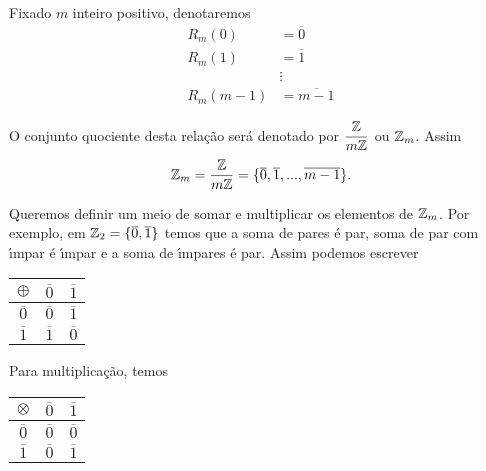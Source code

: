 \documentclass{beamer}
\begin{document}
    \begin{frame}
        \begin{observacao}
        Fixado $m$ inteiro positivo, denotaremos
        \begin{align*}
            R_{m}(0) &= \overline{0}\\
            R_{m}(1) &= \overline{1}\\
            &\vdots\\
            R_{m}(m-1) &= \overline{m-1}
        \end{align*}

        O conjunto quociente desta rela{\c c}{\~a}o ser{\'a} denotado por $\displaystyle\frac{\mathbb{Z}}{m\mathbb{Z}}$ ou $\mathbb{Z}_m$. Assim
        \[
            \mathbb{Z}_m = \displaystyle\frac{\mathbb{Z}}{m\mathbb{Z}}=\{\overline{0},\overline{1},...,\overline{m-1}\}.
        \]
        \end{observacao}
    \end{frame}

    \begin{frame}
        Queremos definir um meio de somar e multiplicar os elementos de $\mathbb{Z}_m$. Por exemplo, em $\mathbb{Z}_2 = \{\overline{0},\overline{1}\}$ temos que a soma de pares {\'e} par, soma de par com {\'\i}mpar {\'e} {\'\i}mpar e a soma de {\'\i}mpares {\'e} par. Assim podemos escrever

        \begin{table}[h]
           \centering 
           \setlength{\arrayrulewidth}{0,5\arrayrulewidth}
           \begin{tabular}{|c|c|c|} 
              \hline
              $\oplus$ & $\overline{0}$ & $\overline{1}$ \T\\
              \hline
              $\overline{0}$ & $\overline{0}$ & $\overline{1}$\T\\
              \hline
              $\overline{1}$ & $\overline{1}$ & $\overline{0}$\T\\
              \hline
           \end{tabular}
        \end{table}

        Para multiplica{\c c}{\~a}o, temos

        \begin{table}[h]
           \centering 
           \setlength{\arrayrulewidth}{0,5\arrayrulewidth}
           \begin{tabular}{|c|c|c|} 
              \hline
              $\otimes$ & $\overline{0}$ & $\overline{1}$\T\\
              \hline
              $\overline{0}$ & $\overline{0}$ & $\overline{0}$\T\\
              \hline
              $\overline{1}$ & $\overline{0}$ & $\overline{1}$\T\\
              \hline
           \end{tabular}
        \end{table}
    \end{frame}
\end{document}
